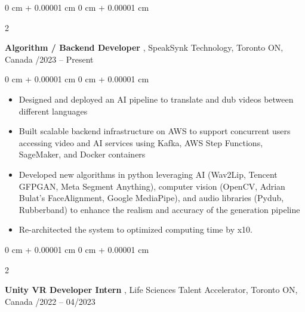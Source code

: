\documentclass[10pt, letterpaper]{article}
\newenvironment{highlights}{
    \begin{itemize}[
        topsep=0.10 cm,
        parsep=0.10 cm,
        partopsep=0pt,
        itemsep=0pt,
        leftmargin=0 cm + 10pt
    ]
}{
    \end{itemize}
} %
\newenvironment{onecolentry}{
    \begin{adjustwidth}{
        0 cm + 0.00001 cm
    }{
        0 cm + 0.00001 cm
    }
}{
    \end{adjustwidth}
} %
\newenvironment{twocolentry}[2][]{
    \onecolentry
    \def\secondColumn{#2}
    \setcolumnwidth{\fill, 4.5 cm}
    \begin{paracol}{2}
}{
    \switchcolumn \raggedleft \secondColumn
    \end{paracol}
    \endonecolentry
} %
\begin{document}
        \vspace{0.2 cm}

        \begin{twocolentry}{
            05/2023 – Present
        }
            \textbf{Algorithm / Backend Developer }, SpeakSynk Technology, Toronto ON, Canada\end{twocolentry}

        \vspace{0.10 cm}
        \begin{onecolentry}
            \begin{highlights}
                \item Designed and deployed an AI pipeline to translate and dub videos between different languages  
                \item Built scalable backend infrastructure on AWS to support concurrent users accessing video and AI services using Kafka, AWS Step Functions, SageMaker, and Docker containers 
                \item Developed new algorithms in python leveraging AI (Wav2Lip, Tencent GFPGAN, Meta Segment Anything), computer vision (OpenCV, Adrian Bulat’s FaceAlignment, Google MediaPipe), and audio libraries (Pydub, Rubberband) to enhance the realism and accuracy of the generation pipeline 
                \item Re-architected the system to optimized computing time by x10.
            \end{highlights}
        \end{onecolentry}

        \vspace{0.2 cm}

           \begin{twocolentry}{
            05/2022 – 04/2023
        }
            \textbf{Unity VR Developer Intern }, Life Sciences Talent Accelerator, Toronto ON, Canada\end{twocolentry}
\end{document}
